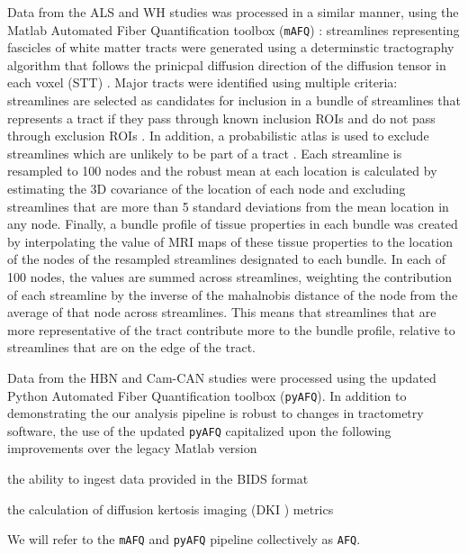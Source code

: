 \documentclass[10pt,%
               aps,%
               prl,%
               preprint,%
               superscriptaddress,%
               preprintnumbers,%
               amsmath,%
               floatfix,%
               endfloats*]{revtex4-2}
\begin{document}
Data from the ALS and WH studies was processed in a similar manner,
using the Matlab Automated Fiber Quantification toolbox (\texttt{mAFQ})
\cite{yeatman2012tract}: streamlines representing fascicles of white
matter tracts were generated using a determinstic tractography algorithm
that follows the prinicpal diffusion direction of the diffusion tensor
in each voxel (STT) \cite{basser2000vivo}. Major tracts were identified
using multiple criteria: streamlines are selected as candidates for
inclusion in a bundle of streamlines that represents a tract if they
pass through known inclusion ROIs and do not pass through exclusion
ROIs \cite{wakana2007reproducibility}. In addition, a probabilistic
atlas is used to exclude streamlines which are unlikely to be part of
a tract \cite{Hua2008-sh}. Each streamline is resampled to 100 nodes
and the robust mean at each location is calculated by estimating the 3D
covariance of the location of each node and excluding streamlines that
are more than 5 standard deviations from the mean location in any node.
Finally, a bundle profile of tissue properties in each bundle was created
by interpolating the value of MRI maps of these tissue properties to the
location of the nodes of the resampled streamlines designated to each
bundle. In each of 100 nodes, the values are summed across streamlines,
weighting the contribution of each streamline by the inverse of the
mahalnobis distance of the node from the average of that node across
streamlines. This means that streamlines that are more representative of
the tract contribute more to the bundle profile, relative to streamlines
that are on the edge of the tract.

Data from the HBN and Cam-CAN studies were processed using the updated Python
Automated Fiber Quantification toolbox (\texttt{pyAFQ}). In addition to demonstrating the our analysis pipeline is robust
to changes in tractometry software, the use of the updated \texttt{pyAFQ}
capitalized upon the following improvements over the legacy Matlab version
\begin{enumerate*}[%
    label=(\roman*),%
    before=\unskip{: },%
    itemjoin={{, }},%
    itemjoin*={{, and }}]
    \item the ability to ingest data provided in the BIDS format
    \cite{gorgolewski2016brain}
    \item the calculation of diffusion kertosis imaging (DKI
    \cite{jensen2005diffusion}) metrics
\end{enumerate*}
We will refer to the \texttt{mAFQ} and \texttt{pyAFQ} pipeline collectively
as \texttt{AFQ}.
\end{document}
